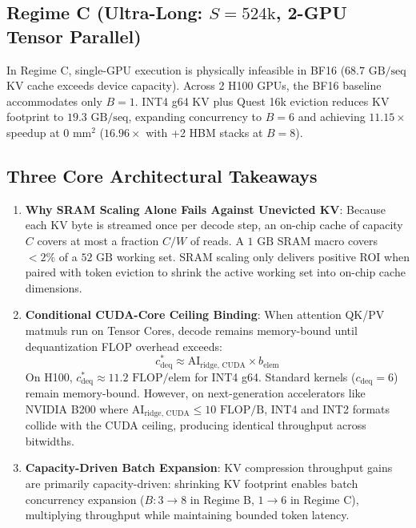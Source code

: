 \documentclass[conference,onecolumn]{IEEEtran}
\begin{document}
\subsection{Regime C (Ultra-Long: $S = 524\text{k}$, 2-GPU Tensor Parallel)}
In Regime C, single-GPU execution is physically infeasible in BF16 ($68.7\text{ GB/seq}$ KV cache exceeds device capacity). Across 2 H100 GPUs, the BF16 baseline accommodates only $B=1$. INT4 g64 KV plus Quest 16k eviction reduces KV footprint to $19.3\text{ GB/seq}$, expanding concurrency to $B=6$ and achieving $\mathbf{11.15\times}$ speedup at $0\text{ mm}^2$ ($16.96\times$ with +2 HBM stacks at $B=8$).

\subsection{Three Core Architectural Takeaways}
\begin{enumerate}
    \item \textbf{Why SRAM Scaling Alone Fails Against Unevicted KV}: Because each KV byte is streamed once per decode step, an on-chip cache of capacity $C$ covers at most a fraction $C/W$ of reads. A $1\text{ GB}$ SRAM macro covers $<2\%$ of a $52\text{ GB}$ working set. SRAM scaling only delivers positive ROI when paired with token eviction to shrink the active working set into on-chip cache dimensions.
    \item \textbf{Conditional CUDA-Core Ceiling Binding}: When attention QK/PV matmuls run on Tensor Cores, decode remains memory-bound until dequantization FLOP overhead exceeds:
    \begin{equation}
    c_{\text{deq}}^* \approx \text{AI}_{\text{ridge, CUDA}} \times b_{\text{elem}}
    \end{equation}
    On H100, $c_{\text{deq}}^* \approx 11.2\text{ FLOP/elem}$ for INT4 g64. Standard kernels ($c_{\text{deq}} = 6$) remain memory-bound. However, on next-generation accelerators like NVIDIA B200 where $\text{AI}_{\text{ridge, CUDA}} \le 10\text{ FLOP/B}$, INT4 and INT2 formats collide with the CUDA ceiling, producing identical throughput across bitwidths.
    \item \textbf{Capacity-Driven Batch Expansion}: KV compression throughput gains are primarily capacity-driven: shrinking KV footprint enables batch concurrency expansion ($B: 3 \to 8$ in Regime B, $1 \to 6$ in Regime C), multiplying throughput while maintaining bounded token latency.
\end{enumerate}
\end{document}
